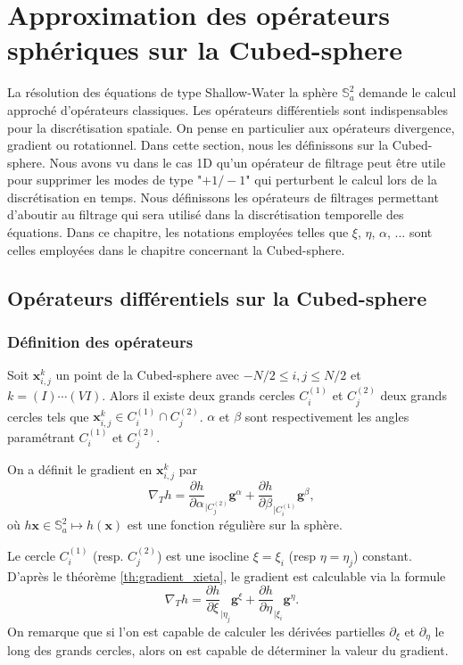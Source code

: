 
\chapter{Approximation des opérateurs sphériques sur la Cubed-sphere}

La résolution des équations de type Shallow-Water \REF la sphère $\mathbb{S}_a^2$ demande le calcul approché d'opérateurs classiques. Les opérateurs différentiels sont indispensables pour la discrétisation spatiale. On pense en particulier aux opérateurs divergence, gradient ou rotationnel. Dans cette section, nous les définissons sur la Cubed-sphere. 
Nous avons vu dans le cas 1D qu'un opérateur de filtrage peut être utile pour supprimer les modes de type "$+1/-1$" qui perturbent le calcul lors de la discrétisation en temps. Nous définissons les opérateurs de filtrages permettant d'aboutir au filtrage qui sera utilisé dans la discrétisation temporelle des équations.
Dans ce chapitre, les notations employées telles que $\xi$, $\eta$, $\alpha$, ... sont celles employées dans le chapitre \REF concernant la Cubed-sphere.

\section{Opérateurs différentiels sur la Cubed-sphere}

\subsection{Définition des opérateurs}
Soit $\mathbf{x}_{i,j}^k$ un point de la Cubed-sphere avec $- N/2 \leq i,j \leq N/2$ et $k = (I) \cdots (VI)$. Alors il existe deux grands cercles $C_i^{(1)}$ et $C_j^{(2)}$ deux grands cercles tels que $\mathbf{x}_{i,j}^k \in C_i^{(1)} \cap C^{(2)}_j$. $\alpha$ et $\beta$ sont respectivement les angles paramétrant $C_i^{(1)}$ et $C_j^{(2)}$.

On a définit le gradient en $\mathbf{x}_{i,j}^k$ par 
\begin{equation}
\nabla_T h = \dfrac{\partial h}{\partial \alpha}_{|C^{(2)}_j} \mathbf{g}^{\alpha} + \dfrac{\partial h}{\partial \beta}_{|C^{(1)}_i} \mathbf{g}^{\beta},
\end{equation}
où $h \mathbf{x} \in \mathbb{S}_a^2 \mapsto h(\mathbf{x})$ est une fonction régulière sur la sphère.

Le cercle $C_i^{(1)}$ (resp. $C_j^{(2)}$) est une isocline $\xi = \xi_i$ (resp $\eta = \eta_j$) constant. D'après le théorème \eqref{th:gradient_xieta}, le gradient est calculable via la formule
\begin{equation}
\nabla_T h = \dfrac{\partial h}{\partial \xi}_{|\eta_j} \mathbf{g}^{\xi} + \dfrac{\partial h}{\partial \eta}_{|\xi_i} \mathbf{g}^{\eta}.
\end{equation}
On remarque que si l'on est capable de calculer les dérivées partielles $\partial_{\xi}$ et $\partial_{\eta}$ le long des grands cercles, alors on est capable de déterminer la valeur du gradient.

